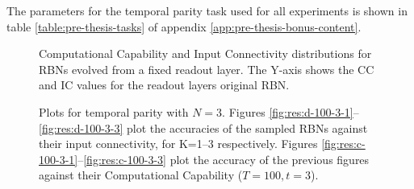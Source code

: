 The parameters for the temporal parity task used for all experiments is shown in table \ref{table:pre-thesis-tasks} of appendix \ref{app:pre-thesis-bonus-content}.

\begin{figure}[ht]
    \centering
    \caption[Computational capability and input connectivity for evolved RBNs]{
        Computational Capability and Input Connectivity distributions for RBNs evolved from a fixed readout layer.
        The Y-axis shows the CC and IC values for the readout layers original RBN.
    }
\end{figure}

\begin{figure}
    \centering
    \caption[Temporal parity 3: Accuracy and computational capability plots]{
        Plots for temporal parity with $N=3$.
        Figures \ref{fig:res:d-100-3-1}--\ref{fig:res:d-100-3-3} plot the accuracies of the sampled RBNs against their input connectivity,
        for K=1–3 respectively.
        Figures \ref{fig:res:c-100-3-1}--\ref{fig:res:c-100-3-3} plot the accuracy of the previous figures against their Computational Capability ($T=100, t=3$).
    }
    \label{figure:results:temporal-parity-3}


\end{figure}

